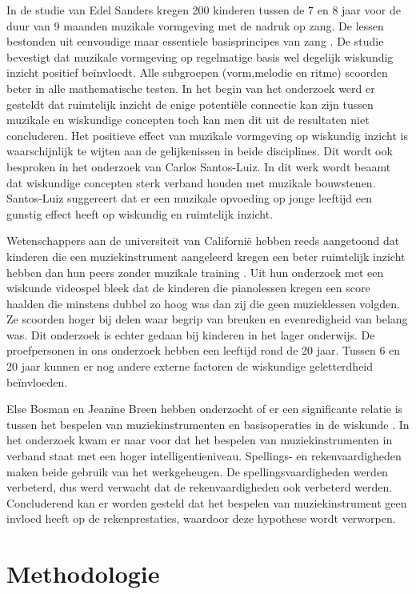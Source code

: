 \documentclass{hogent-article}
\begin{document}
In de studie van Edel Sanders kregen 200 kinderen tussen de 7 en 8 jaar voor de duur van 9 maanden muzikale vormgeving met de nadruk op zang. De lessen bestonden uit eenvoudige maar essentiele basisprincipes van zang \autocite{Sanders2012}. De studie bevestigt dat muzikale vormgeving op regelmatige basis wel degelijk wiskundig inzicht positief beïnvloedt. Alle subgroepen (vorm,melodie en ritme) scoorden beter in alle mathematische testen. In het begin van het onderzoek werd er gesteldt dat ruimtelijk inzicht de enige potentiële connectie kan zijn tussen muzikale en wiskundige concepten toch kan men dit uit de resultaten niet concluderen. Het positieve effect van muzikale vormgeving op wiskundig inzicht is waarschijnlijk te wijten aan de gelijkenissen in beide disciplines. Dit wordt ook besproken in het onderzoek van Carlos Santos-Luiz. In dit werk wordt beaamt dat wiskundige concepten sterk verband houden met muzikale bouwstenen. Santos-Luiz suggereert dat er een muzikale opvoeding op jonge leeftijd een gunstig effect heeft op wiskundig en ruimtelijk inzicht.

Wetenschappers aan de universiteit van Californië hebben reeds aangetoond dat kinderen die een muziekinstrument aangeleerd kregen een beter ruimtelijk inzicht hebben dan hun peers zonder muzikale training \autocite{Graziano1999}. Uit hun onderzoek met een wiskunde videospel bleek dat de kinderen die pianolessen kregen een score haalden die minstens dubbel zo hoog was dan zij die geen muzieklessen volgden. Ze scoorden hoger bij delen waar begrip van breuken en evenredigheid van belang was. Dit onderzoek is echter gedaan bij kinderen in het lager onderwijs. De proefpersonen in ons onderzoek hebben een leeftijd rond de 20 jaar. Tussen 6 en 20 jaar kunnen er nog andere externe factoren de wiskundige geletterdheid beïnvloeden.

Else Bosman en Jeanine Breen hebben onderzocht of er een significante relatie is tussen het bespelen van muziekinstrumenten en basisoperaties in de wiskunde \autocite{Bosman2018}. In het onderzoek kwam er naar voor dat het bespelen van muziekinstrumenten in verband staat met een hoger intelligentieniveau. Spellings- en rekenvaardigheden maken beide gebruik van het werkgeheugen. De spellingsvaardigheden werden verbeterd, dus werd verwacht dat de rekenvaardigheden ook verbeterd werden. Concluderend kan er worden gesteld dat het bespelen van muziekinstrument geen invloed heeft op de rekenprestaties, waardoor deze hypothese wordt verworpen.

\section{Methodologie}
\end{document}
